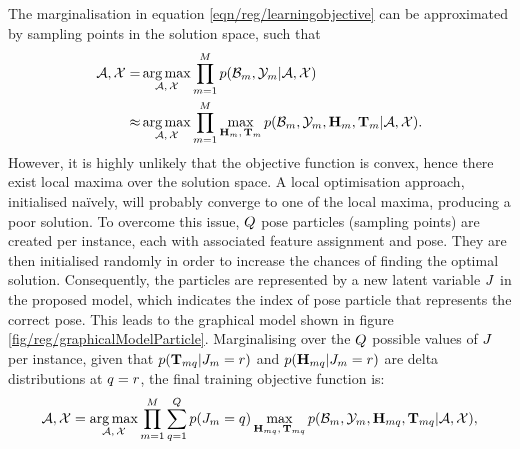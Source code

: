 The marginalisation in equation \ref{eqn/reg/learningobjective} can be approximated by sampling points in the solution space, such that 
\begin{equation}
	\begin{aligned}
		\mathcal{A},\mathcal{X} = & \operatorname*{arg\,max}_{\mathcal{A},\,\mathcal{X}}
		\displaystyle\prod_{m=1}^M
		p(\mathcal{B}_m,\mathcal{Y}_m|\mathcal{A},\mathcal{X}) \\ 
		\approx &  
		\operatorname*{arg\,max}_{\mathcal{A},\,\mathcal{X}}
		\displaystyle\prod_{m=1}^M
		\max_{\mathbf{H}_m,\,\mathbf{T}_m}
		p(\mathcal{B}_m,\mathcal{Y}_m,\mathbf{H}_m,\mathbf{T}_m|\mathcal{A},\mathcal{X}).
	\end{aligned}
	\label{eqn/reg/approximatemaximumpose}
\end{equation}
However, it is highly unlikely that the objective function is convex, hence there exist local maxima over the solution space. A local optimisation approach, initialised na\"{i}vely, will probably converge to one of the local maxima, producing a poor solution. 
To overcome this issue, $Q$ pose particles (sampling points) are created per instance, each with associated feature assignment and pose. They are then initialised randomly in order to increase the chances of finding the optimal solution. 
Consequently, the particles are represented by a new latent variable ${J}$ in the proposed model, which indicates the index of pose particle that represents the correct pose. This leads to the graphical model shown in figure \ref{fig/reg/graphicalModelParticle}. Marginalising over the $Q$ possible values of ${J}$ per instance, given that 
$p(\mathbf{T}_{mq}|{J}_{m}  =  r)$ and $p(\mathbf{H}_{mq}|{J}_{m}  =  r)$ are delta distributions at $q=r$, the final training objective function is: 
\begin{equation}
	\mathcal{A},\mathcal{X} = \operatorname*{arg\,max}_{\mathcal{A},\,\mathcal{X}}
	\prod_{m=1}^M \sum_{q = 1}^{Q} 
	p({J}_{m} = q)
	\max_{\mathbf{H}_{mq},\,\mathbf{T}_{mq}} p(\mathcal{B}_m,\mathcal{Y}_m,\mathbf{H}_{mq},\mathbf{T}_{mq}|\mathcal{A},\mathcal{X}), 
	\label{eqn/reg/particleapproximation}
\end{equation}
